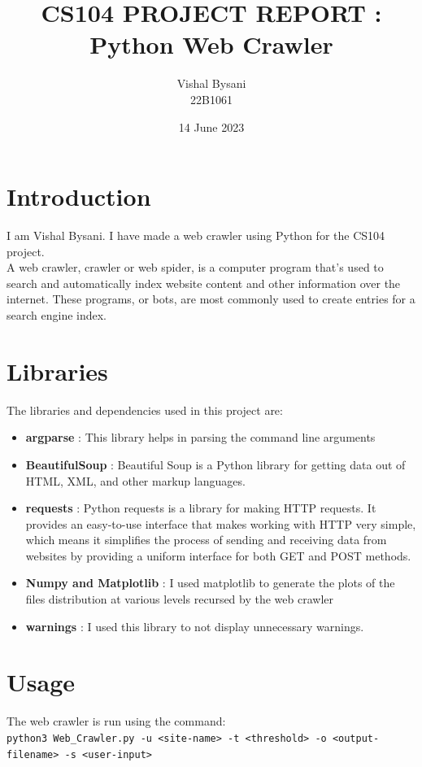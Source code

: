 \documentclass{article}
\begin{document}
\title{\textbf{CS104 PROJECT REPORT} : \\Python Web Crawler}
\author{Vishal Bysani \\22B1061}
\date{14 June 2023}
\maketitle


\section*{Introduction}
I am Vishal Bysani. I have made a web crawler using Python for the CS104 project. \\
A web crawler, crawler or web spider, is a computer program that's used to search and automatically index website content and other information over the internet. These programs, or bots, are most commonly used to create entries for a search engine index.
\section*{Libraries}
The libraries and dependencies used in this project are:
\begin{itemize}
\item \textbf{argparse} : This library helps in parsing the command line arguments\cite{3}
\item \textbf{BeautifulSoup} : Beautiful Soup is a Python library for getting data out of HTML, XML, and other markup languages. 
\item \textbf{requests} : Python requests is a library for making HTTP requests. It provides an easy-to-use interface that makes working with HTTP very simple, which means it simplifies the process of sending and receiving data from websites by providing a uniform interface for both GET and POST methods.
\item \textbf{Numpy and Matplotlib} : I used matplotlib to generate the plots of the files distribution at various levels recursed by the web crawler\cite{1}
\item \textbf{warnings} : I used this library to not display unnecessary warnings.
\end{itemize}
\section*{Usage}
The web crawler is run using the command:\\
\texttt{python3 Web\_Crawler.py -u <site-name> -t <threshold> -o <output-filename> -s <user-input>}
\end{document}
